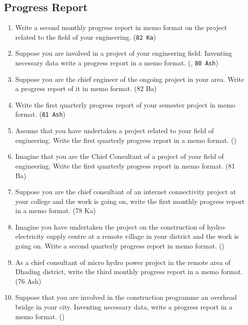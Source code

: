 \documentclass[12pt]{article}
\begin{document}
  \subsection{Progress Report}
    \begin{enumerate}
      \item Write a second monthly progress report in memo format on the project related to the field of your engineering. \hfill (\texttt{82 Ka})

      \item Suppose you are involved in a project of your engineering field. Inventing necessary data write a progress report in a memo format. \hfill (, \texttt{80 Ash})

      \item Suppose you are the chief engineer of the ongoing project in your area. Write a progress report of it in memo format. \hfill (82 Ba)

      \item Write the first quarterly progress report of your semester project in memo format. \hfill (\texttt{81 Ash})

      \item Assume that you have undertaken a project related to your field of engineering. Write the first quarterly progress report in a memo format. \hfill ()

      \item Imagine that you are the Chief Consultant of a project of your field of engineering. Write the first quarterly progress report in memo format. \hfill (81 Ba)

      \item Suppose you are the chief consultant of an internet connectivity project at your college and the work is going on, write the first monthly progress report in a memo format. \hfill (78 Ka)

      \item Imagine you have undertaken the project on the construction of hydro-electricity supply centre at a remote village in your district and the work is going on. Write a second quarterly progress report in memo format. \hfill ()

      \item As a chief consultant of micro hydro power project in the remote area of Dhading district, write the third monthly progress report in a memo format. \hfill (76 Ash)

      \item Suppose that you are involved in the construction programme an overhead bridge in your city. Inventing necessary data, write a progress report in a memo format. \hfill ()
    \end{enumerate}
\end{document}
